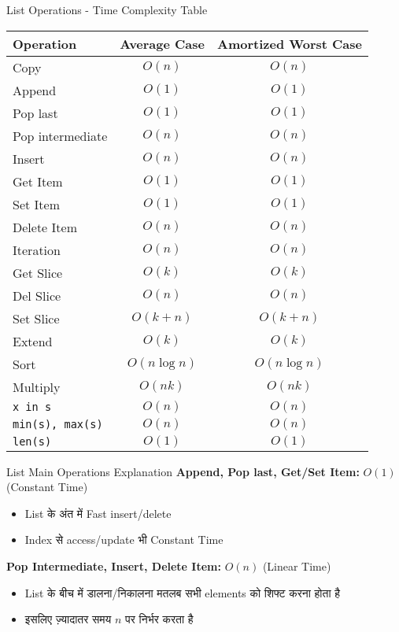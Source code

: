\documentclass[aspectratio=169]{beamer}
\begin{document}
\begin{frame}{List Operations - Time Complexity Table}
\centering
\small
\begin{tabular}{lcc}
\rowcolor{GoogleBlue!10}
\textbf{Operation} & \textbf{Average Case} & \textbf{Amortized Worst Case} \\
\midrule
Copy                & $O(n)$    & $O(n)$ \\
Append              & $O(1)$    & $O(1)$ \\
Pop last            & $O(1)$    & $O(1)$ \\
Pop intermediate    & $O(n)$    & $O(n)$ \\
Insert              & $O(n)$    & $O(n)$ \\
Get Item            & $O(1)$    & $O(1)$ \\
Set Item            & $O(1)$    & $O(1)$ \\
Delete Item         & $O(n)$    & $O(n)$ \\
Iteration           & $O(n)$    & $O(n)$ \\
Get Slice           & $O(k)$    & $O(k)$ \\
Del Slice           & $O(n)$    & $O(n)$ \\
Set Slice           & $O(k+n)$  & $O(k+n)$ \\
Extend              & $O(k)$    & $O(k)$ \\
Sort                & $O(n\log n)$ & $O(n\log n)$ \\
Multiply            & $O(nk)$   & $O(nk)$ \\
\texttt{x in s}     & $O(n)$    & $O(n)$ \\
\texttt{min(s), max(s)} & $O(n)$ & $O(n)$ \\
\texttt{len(s)}     & $O(1)$    & $O(1)$ \\
\end{tabular}
\end{frame}

\begin{frame}{List Main Operations Explanation}
\textcolor{GoogleRed}{\textbf{Append, Pop last, Get/Set Item:}} $O(1)$ (Constant Time)
\begin{itemize}
    \item List के अंत में Fast insert/delete
    \item Index से access/update भी Constant Time
\end{itemize}
\vskip0.2cm
\textcolor{GoogleBlue}{\textbf{Pop Intermediate, Insert, Delete Item:}} $O(n)$ (Linear Time)
\begin{itemize}
    \item List के बीच में डालना/निकालना मतलब सभी elements को शिफ्ट करना होता है
    \item इसलिए ज़्यादातर समय $n$ पर निर्भर करता है
\end{itemize}
\end{frame}
\end{document}
